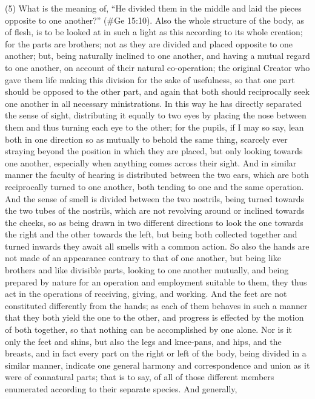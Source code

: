 (5) What is the meaning of, ``He divided them in the middle and laid the pieces opposite to one
another?'' (\#Ge 15:10). Also the whole structure of the body, as of flesh, is to be looked at in
such a light as this according to its whole creation; for the parts are brothers; not as they are
divided and placed opposite to one another; but, being naturally inclined to one another, and having
a mutual regard to one another, on account of their natural co-operation; the original Creator who
gave them life making this division for the sake of usefulness, so that one part should be opposed
to the other part, and again that both should reciprocally seek one another in all necessary
ministrations. In this way he has directly separated the sense of sight, distributing it equally to two
eyes by placing the nose between them and thus turning each eye to the other; for the pupils, if I
may so say, lean both in one direction so as mutually to behold the same thing, scarcely ever
straying beyond the position in which they are placed, but only looking towards one another,
especially when anything comes across their sight. And in similar manner the faculty of hearing is
distributed between the two ears, which are both reciprocally turned to one another, both tending to
one and the same operation. And the sense of smell is divided between the two nostrils, being
turned towards the two tubes of the nostrils, which are not revolving around or inclined towards the
cheeks, so as being drawn in two different directions to look the one towards the right and the
other towards the left, but being both collected together and turned inwards they await all smells
with a common action. So also the hands are not made of an appearance contrary to that of one
another, but being like brothers and like divisible parts, looking to one another mutually, and being
prepared by nature for an operation and employment suitable to them, they thus act in the
operations of receiving, giving, and working. And the feet are not constituted differently from the
hands; as each of them behaves in such a manner that they both yield the one to the other, and
progress is effected by the motion of both together, so that nothing can be accomplished by one
alone. Nor is it only the feet and shins, but also the legs and knee-pans, and hips, and the breasts,
and in fact every part on the right or left of the body, being divided in a similar manner, indicate one
general harmony and correspondence and union as it were of connatural parts; that is to say, of all
of those different members enumerated according to their separate species. And generally,
